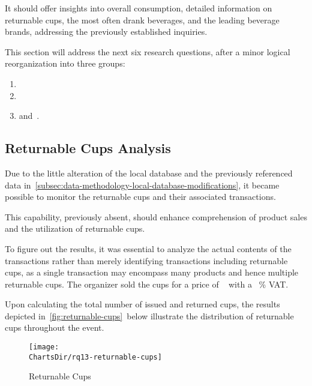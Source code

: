 It should offer insights into overall consumption, detailed information on returnable cups, the most often drank beverages, and the leading beverage brands, addressing the previously established inquiries.

This section will address the next six research questions, after a minor logical reorganization into three groups:
\begin{enumerate}
	\item {}
	\item {}
	\item and~.
\end{enumerate}


\subsection{Returnable Cups Analysis}
\label{subsec:analysis-beverage-returnable-cups}

Due to the little alteration of the local database and the previously referenced data in~\autoref{subsec:data-methodology-local-database-modifications}, it became possible to monitor the returnable cups and their associated transactions.

This capability, previously absent, should enhance comprehension of product sales and the utilization of returnable cups.


To figure out the results, it was essential to analyze the actual contents of the transactions rather than merely identifying transactions including returnable cups,
as a single transaction may encompass many products and hence multiple returnable cups.
The organizer sold the cups for a price of ~ with a ~\% VAT.\

Upon calculating the total number of issued and returned cups, the results depicted in~\autoref{fig:returnable-cups}~below illustrate the distribution of returnable cups throughout the event.

\begin{figure}[H]
	\centering
	\texttt{[image: \\ChartsDir/rq13-returnable-cups]}
	\caption{ Returnable Cups}
	\label{fig:returnable-cups}
	\source
\end{figure}

